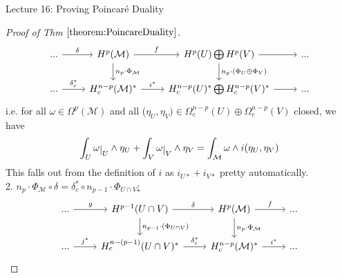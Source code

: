 \documentclass[10pt]{article}
\theoremstyle{plain}
\theoremstyle{definition}
\newcommand{\man}{\mathcal{M}}
\def\restrict#1{\raise-.5ex\hbox{\ensuremath|}_{#1}}
\newcommand{\UintV}{U\cap V}
\begin{document}
\begin{section}{Lecture 16: Proving Poincar\'e Duality}
\begin{proof}[Proof of Thm $\ref{theorem:PoincareDuality}$]
$$\begin{tikzcd}
... \arrow[r, "\delta"]     & H^p(\mathcal{M}) \arrow[r, "f"] \arrow[d, "n_p \cdot \Phi_\mathcal{M}"] & H^p(U) \bigoplus H^p(V) \arrow[r] \arrow[d, "n_p\cdot(\Phi_U \oplus \Phi_V)"] & ... \\
... \arrow[r, "\delta_c^*"] & H^{n-p}_c(\mathcal{M})^* \arrow[r, "i^*"]                                & H_c^{n-p}(U)^* \bigoplus H_c^{n-p}(V)^* \arrow[r]                             & ...
\end{tikzcd}$$
i.e. for all $\omega \in \Omega^p(\man) $ and all ($\eta_U,\eta_V) \in \Omega_c^{n-p}(U) \oplus \Omega_c^{n-p}(V)$ closed, we have 
$$\int_U \omega\restrict{U} \wedge \eta_U + \int_V \omega\restrict{V} \wedge \eta_V = \int_\man \omega \wedge i(\eta_U,\eta_V)$$
This falls out from the definition of $i$ as $i_{U*} + i_{V*}$ pretty automatically.
\\
2. \underline{$n_p \cdot \Phi_\man \circ \delta = \delta_c^* \circ n_{p-1} \cdot \Phi_{\UintV} $:}
$$%
\begin{tikzcd}
... \arrow[r, "g"]   & H^{p-1}(U\cap V) \arrow[r, "\delta"] \arrow[d, "n_{p-1}\cdot(\Phi_{U\cap V})"] & H^p(\mathcal{M}) \arrow[r, "f"] \arrow[d, "n_p \cdot \Phi_\mathcal{M}"] & ... \\
... \arrow[r, "j^*"] & H^{n-(p-1)}_c(U\cap V)^* \arrow[r, "\delta_c^*"]                                 & H^{n-p}_c(\mathcal{M})^* \arrow[r, "i^*"]                                & ...
\end{tikzcd}
$$

\end{proof}
\end{section}
\end{document}
